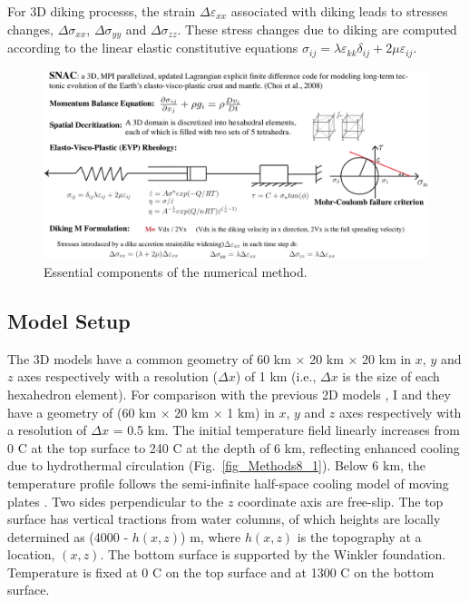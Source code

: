 For 3D diking processs, the strain $\Delta\varepsilon_{xx}$ associated with diking leads to stresses changes, $\Delta\sigma_{xx}$, $\Delta\sigma_{yy}$ and $\Delta\sigma_{zz}$. These stress changes due to diking are computed according to the linear elastic constitutive equations $\sigma_{ij}=\lambda\varepsilon_{kk}\delta_{ij}+2\mu\varepsilon_{ij}$.

\begin{figure}[H]
 \centering
  \includegraphics[width=1.0\textwidth]{./Figures/fig_Methods7_3.png}
 \caption{\small{Essential components of the numerical method.}}
 \label{fig_Methods7_3}
\end{figure}

\subsection{Model Setup}
The 3D models have a common geometry of 60 km $\times$ 20 km $\times$ 20 km in $x$, $y$ and $z$ axes  respectively with a resolution ($\Delta x$) of 1 km (i.e., $\Delta x$ is the size of each hexahedron element). For comparison with the previous 2D models \citep[e.g.][]{Buck2005, Tucholke2008}, I  and they have a geometry of (60 km $\times$ 20 km $\times$ 1 km) in $x$, $y$ and $z$ axes respectively with a resolution of $\Delta x$ = 0.5 km. The initial temperature field linearly increases from 0 \degree C at the top surface to 240 \degree C at the depth of 6 km, reflecting enhanced cooling due to hydrothermal circulation (Fig.~\ref{fig_Methods8_1}). Below 6 km, the temperature profile follows the semi-infinite half-space cooling model of moving plates \citep[e.g.,][]{Turcotte2002}. Two sides perpendicular to the $z$ coordinate axis are free-slip. The top surface has vertical tractions from water columns, of which heights are locally determined as (4000 - $h(x,z)$) m, where $h(x,z)$ is the topography at a location, $(x,z)$. The bottom surface is supported by the Winkler foundation. Temperature is fixed at 0 \degree C on the top surface and at 1300 \degree C on the bottom surface. 

